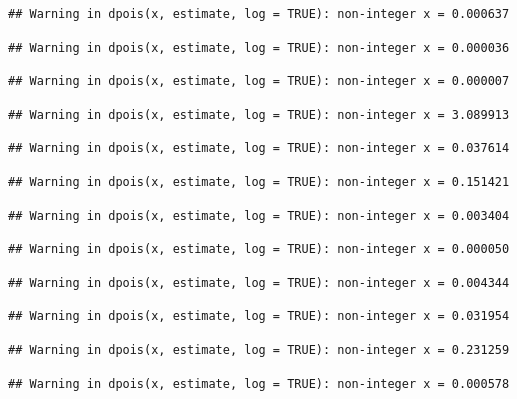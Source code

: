 \documentclass[]{article}
\begin{document}
\begin{verbatim}
## Warning in dpois(x, estimate, log = TRUE): non-integer x = 0.000637
\end{verbatim}

\begin{verbatim}
## Warning in dpois(x, estimate, log = TRUE): non-integer x = 0.000036
\end{verbatim}

\begin{verbatim}
## Warning in dpois(x, estimate, log = TRUE): non-integer x = 0.000007
\end{verbatim}

\begin{verbatim}
## Warning in dpois(x, estimate, log = TRUE): non-integer x = 3.089913
\end{verbatim}

\begin{verbatim}
## Warning in dpois(x, estimate, log = TRUE): non-integer x = 0.037614
\end{verbatim}

\begin{verbatim}
## Warning in dpois(x, estimate, log = TRUE): non-integer x = 0.151421
\end{verbatim}

\begin{verbatim}
## Warning in dpois(x, estimate, log = TRUE): non-integer x = 0.003404
\end{verbatim}

\begin{verbatim}
## Warning in dpois(x, estimate, log = TRUE): non-integer x = 0.000050
\end{verbatim}

\begin{verbatim}
## Warning in dpois(x, estimate, log = TRUE): non-integer x = 0.004344
\end{verbatim}

\begin{verbatim}
## Warning in dpois(x, estimate, log = TRUE): non-integer x = 0.031954
\end{verbatim}

\begin{verbatim}
## Warning in dpois(x, estimate, log = TRUE): non-integer x = 0.231259
\end{verbatim}

\begin{verbatim}
## Warning in dpois(x, estimate, log = TRUE): non-integer x = 0.000578
\end{verbatim}
\end{document}
